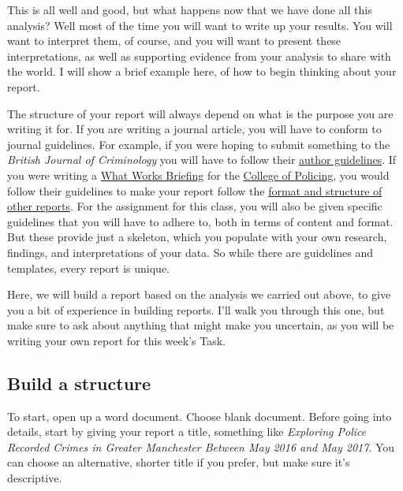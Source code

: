\documentclass[
]{book}
\begin{document}
This is all well and good, but what happens now that we have done all this analysis? Well most of the time you will want to write up your results. You will want to interpret them, of course, and you will want to present these interpretations, as well as supporting evidence from your analysis to share with the world. I will show a brief example here, of how to begin thinking about your report.

The structure of your report will always depend on what is the purpose you are writing it for. If you are writing a journal article, you will have to conform to journal guidelines. For example, if you were hoping to submit something to the \emph{British Journal of Criminology} you will have to follow their \href{https://academic.oup.com/bjc/pages/General_Instructions}{author guidelines}. If you were writing a \href{http://whatworks.college.police.uk/Research/Briefings/Pages/default.aspx}{What Works Briefing} for the \href{http://www.college.police.uk/Pages/Home.aspx}{College of Policing}, you would follow their guidelines to make your report follow the \href{http://whatworks.college.police.uk/Research/Briefings/Documents/What\%20Works\%20Street\%20Lighting\%20final\%20version\%20June\%202013.pdf}{format and structure of other reports}. For the assignment for this class, you will also be given specific guidelines that you will have to adhere to, both in terms of content and format. But these provide just a skeleton, which you populate with your own research, findings, and interpretations of your data. So while there are guidelines and templates, every report is unique.

Here, we will build a report based on the analysis we carried out above, to give you a bit of experience in building reports. I'll walk you through this one, but make sure to ask about anything that might make you uncertain, as you will be writing your own report for this week's Task.

\hypertarget{build-a-structure}{%
\subsection{Build a structure}\label{build-a-structure}}

To start, open up a word document. Choose blank document. Before going into details, start by giving your report a title, something like \emph{Exploring Police Recorded Crimes in Greater Manchester Between May 2016 and May 2017}. You can choose an alternative, shorter title if you prefer, but make sure it's descriptive.
\end{document}
